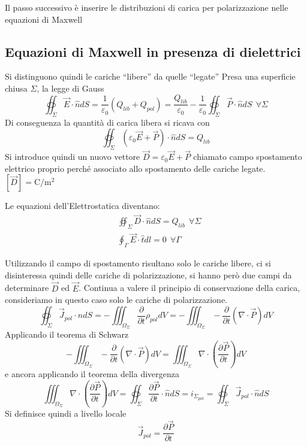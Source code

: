 Il passo successivo è inserire le distribuzioni di carica per 
polarizzazione nelle equazioni di Maxwell

\subsection{Equazioni di Maxwell in presenza di dielettrici}
Si distinguono quindi le cariche ``libere'' da quelle ``legate''
Presa una superficie chiusa $\Sigma$, la legge di Gauss
$$
\oiint_\Sigma \vec{E}\cdot\hat{n}dS = \frac{1}{\varepsilon_0}(Q_{lib}+Q_{pol}) = \frac{Q_{lib}}{\varepsilon_0} - \frac{1}{\varepsilon_0} \oiint_{\Sigma} \vec{P}\cdot\hat{n}dS \ \ \forall\Sigma
$$
Di conseguenza la quantità di carica libera si ricava con
$$
\oiint_{\Sigma} (\varepsilon_0\vec{E}+\vec{P})\cdot \hat{n}dS = 
Q_{lib}
$$
Si introduce quindi un nuovo vettore $\vec{D} = \varepsilon_0\vec{E} + \vec{P}$ chiamato campo spostamento elettrico proprio perché associato allo spostamento delle cariche legate.
$[\vec{D}] = \si{\coulomb\per\meter^2}$

Le equazioni dell'Elettrostatica diventano:
\begin{align*}
&\oiint_{\Sigma}\vec{D}\cdot\hat{n}dS = Q_{lib}\ \ \forall\Sigma \\
&\oint_{\Gamma} \vec{E}\cdot\hat{t}dl = 0 \ \ \forall \Gamma
\end{align*}

Utilizzando il campo di spostamento risultano solo le cariche 
libere, ci si disinteressa quindi delle cariche di polarizzazione,
si hanno però due campi da determinare $\vec{D}$ ed $\vec{E}$.
Continua a valere il principio di conservazione della carica, 
consideriamo in questo caso solo le cariche di polarizzazione.
$$
\oiint_\Sigma\vec{J}_{pol}\cdot\hat{n}dS = 
- \iiint_{\Omega_\Sigma}\frac{\partial}{\partial t} \rho_{pol}dV
= -\iiint_{\Omega_\Sigma} -\frac{\partial}{\partial t} 
(\nabla\cdot\vec{P})dV 
$$
Applicando il teorema di Schwarz
$$
-\iiint_{\Omega_\Sigma} -\frac{\partial}{\partial t} 
(\nabla\cdot\vec{P})dV = \iiint_{\Omega_\Sigma} \nabla\cdot\left(\frac{\partial\vec{P}}{\partial t}\right)dV
$$
e ancora applicando il teorema della divergenza
$$
\iiint_{\Omega_\Sigma} \nabla\cdot\left(\frac{\partial\vec{P}}{\partial t}\right)dV = \oiint_{\Sigma}\frac{\partial \vec{P}}{\partial t} \cdot \hat{n}dS = i_{\Sigma_{pol}} = \oiint_\Sigma\vec{J}_{pol}\cdot\hat{n}dS
$$
Si definisce quindi a livello locale
$$
\vec{J}_{pol} = \frac{\partial \vec{P}}{\partial t}
$$

